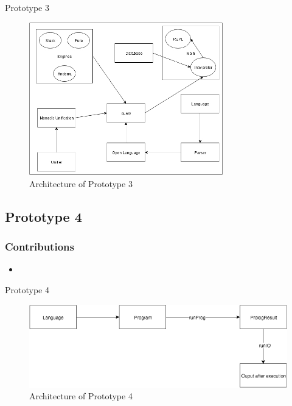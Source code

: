 \documentclass[hideothersubsections, t, aspectratio=1610]{beamer}
\begin{document}
\begin{frame}{Prototype 3}
\begin{figure}[H]
  \includegraphics[width=0.75\textwidth]{Prototype-3-architecture.jpeg}
  \caption{Architecture of Prototype 3}
  \label{fig:proto1-arch}
\end{figure}
\end{frame}


\subsection{Prototype 4}

\begin{frame}
\frametitle{Contributions}
\begin{itemize}
\item
\end{itemize}
\end{frame}


\begin{frame}{Prototype 4}
\begin{figure}[H]
  \includegraphics[width=1\textwidth]{Prototype-4-architecture.jpeg}
  \caption{Architecture of Prototype 4}
  \label{fig:proto1-arch}
\end{figure}
\end{frame}
\end{document}
